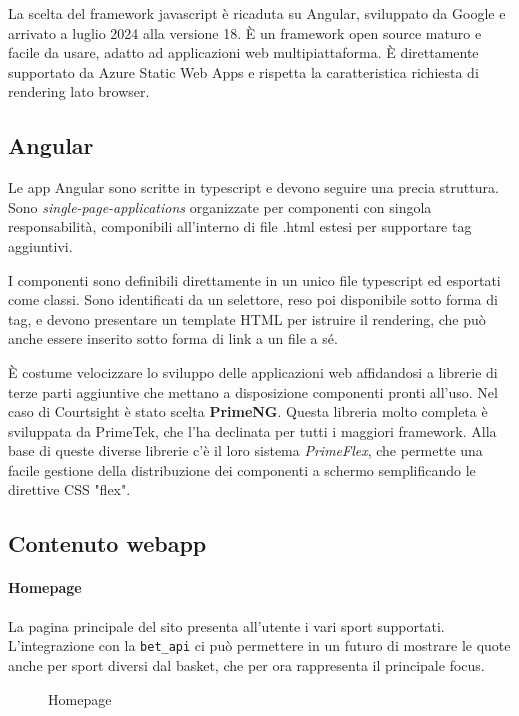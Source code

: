 La scelta del framework javascript è ricaduta su Angular, sviluppato da Google e arrivato a luglio 2024 alla versione 18. È un framework open source maturo e facile da usare, adatto ad applicazioni web multipiattaforma.
È direttamente supportato da Azure Static Web Apps e rispetta la caratteristica richiesta di rendering lato browser.


\subsection{Angular}
Le app Angular sono scritte in typescript e devono seguire una precia struttura. Sono \textit{single-page-applications} organizzate per componenti con singola responsabilità, componibili all'interno di file .html estesi per supportare tag aggiuntivi.

I componenti sono definibili direttamente in un unico file typescript ed esportati come classi. Sono identificati da un selettore, reso poi disponibile sotto forma di tag, e devono presentare un template HTML per istruire il rendering, che può anche essere inserito sotto forma di link a un file a sé.

È costume velocizzare lo sviluppo delle applicazioni web affidandosi a librerie di terze parti aggiuntive che mettano a disposizione componenti pronti all'uso. Nel caso di Courtsight è stato scelta \textbf{PrimeNG}.
Questa libreria molto completa è sviluppata da PrimeTek, che l'ha declinata per tutti i maggiori framework. Alla base di queste diverse librerie c'è il loro sistema \textit{PrimeFlex}, che permette una facile gestione della distribuzione dei componenti a schermo semplificando le direttive CSS "flex".

\subsection{Contenuto webapp}
    \paragraph{Homepage} La pagina principale del sito presenta all'utente i vari sport supportati. L'integrazione con la \texttt{bet\_api} ci può permettere in un futuro di mostrare le quote anche per sport diversi dal basket, che per ora rappresenta il principale focus.
    
    \begin{figure}[H]
        \centering
        \caption{Homepage}
        \label{fig:enter-label}
    \end{figure}
    
